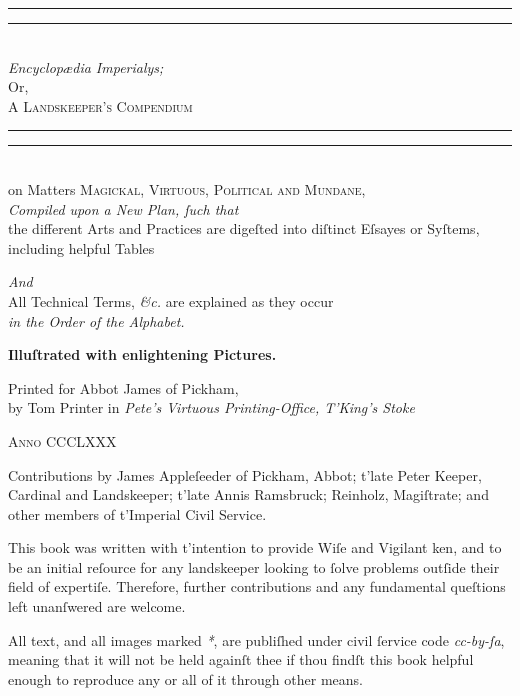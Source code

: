 \documentclass[twoside,11pt,b5paper,twocolumn]{scrbook}
\begin{document}
\begin{titlepage}
 \centering
 \vspace*{\baselineskip}
 \rule{\textwidth}{1.6pt}\vspace*{-\baselineskip}\vspace*{2pt}
 \rule{\textwidth}{0.4pt}\\[\baselineskip]
 
 {\Huge \itshape Encyclopædia Imperialys;}\\[0.4em]
 {\Large Or,\\[0.4em]}
 {\huge\scshape A Landskeeper's Compendium}\\
 \rule{\textwidth}{0.4pt}\vspace*{-\baselineskip}\vspace{3.2pt}
 \rule{\textwidth}{1.6pt}\\[\baselineskip]
 {\Large on Matters \scshape Magickal, Virtuous, Political {\normalfont and} Mundane,\\[1em]}
 {\itshape Compiled upon a New Plan, ſuch that\\[0.5em]}
 {\large the different Arts and Practices are digeſted into diſtinct Eſsayes or Syſtems, including helpful Tables}
 
 {\itshape And\\[0.5em]}
 {\large All Technical Terms, \textit{\&c.} are explained as they occur \\[0.5em] \itshape in the Order of the Alphabet.}

 \vspace{0.8cm}
 {\bfseries Illuſtrated with enlightening Pictures.}
 
 \vfill
 
 Printed for Abbot James of Pickham,\\[0.4em]
 by Tom Printer in {\itshape Pete’s Virtuous Printing-Office, T'King’s Stoke}
 
 {\scshape Anno CCCLXXX}
\end{titlepage}
\begin{uppertitleback}{}
Contributions by James Appleſeeder of Pickham, Abbot; t'late Peter Keeper, Cardinal and Landskeeper; t'late Annis Ramsbruck; Reinholz, Magiſtrate; and other members of t'Imperial Civil Service.

This book was written with t'intention to provide Wiſe and Vigilant ken, and to be an initial reſource for any landskeeper looking to ſolve problems outſide their field of expertiſe. Therefore, further contributions and any fundamental queſtions left unanſwered are welcome.

All text, and all images marked \textit{*}, are publiſhed under civil ſervice code \textit{cc-by-ſa}, meaning that it will not be held againſt thee if thou findſt this book helpful enough to reproduce any or all of it through other means. 
\end{uppertitleback}
\setlength{\parindent}{1em}
\end{document}
